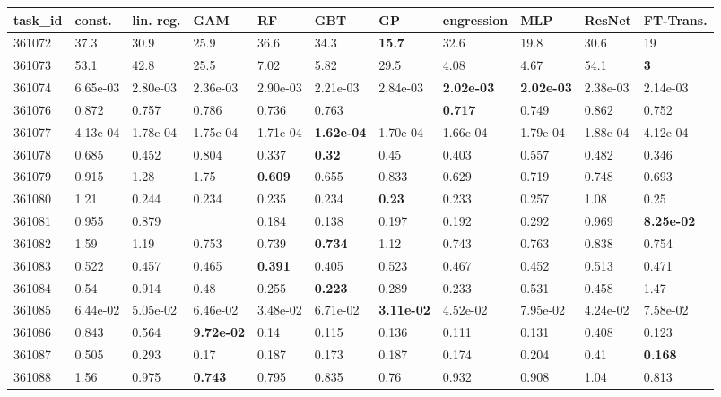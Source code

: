 \begin{table}[ht!]
\centering
\begingroup\footnotesize
\begin{tabular}{lllllllllll}
  \hline
\hline
task\_id & const. & lin. reg. & GAM & RF & GBT & GP & engression & MLP & ResNet & FT-Trans. \\ 
  \hline
361072 & 37.3 & 30.9 & 25.9 & 36.6 & 34.3 & \textbf{15.7} & 32.6 & 19.8 & 30.6 & 19 \\ 
  361073 & 53.1 & 42.8 & 25.5 & 7.02 & 5.82 & 29.5 & 4.08 & 4.67 & 54.1 & \textbf{3} \\ 
  361074 & 6.65e-03 & 2.80e-03 & 2.36e-03 & 2.90e-03 & 2.21e-03 & 2.84e-03 & \textbf{2.02e-03} & \textbf{2.02e-03} & 2.38e-03 & 2.14e-03 \\ 
  361076 & 0.872 & 0.757 & 0.786 & 0.736 & 0.763 &  & \textbf{0.717} & 0.749 & 0.862 & 0.752 \\ 
  361077 & 4.13e-04 & 1.78e-04 & 1.75e-04 & 1.71e-04 & \textbf{1.62e-04} & 1.70e-04 & 1.66e-04 & 1.79e-04 & 1.88e-04 & 4.12e-04 \\ 
  361078 & 0.685 & 0.452 & 0.804 & 0.337 & \textbf{0.32} & 0.45 & 0.403 & 0.557 & 0.482 & 0.346 \\ 
  361079 & 0.915 & 1.28 & 1.75 & \textbf{0.609} & 0.655 & 0.833 & 0.629 & 0.719 & 0.748 & 0.693 \\ 
  361080 & 1.21 & 0.244 & 0.234 & 0.235 & 0.234 & \textbf{0.23} & 0.233 & 0.257 & 1.08 & 0.25 \\ 
  361081 & 0.955 & 0.879 &  & 0.184 & 0.138 & 0.197 & 0.192 & 0.292 & 0.969 & \textbf{8.25e-02} \\ 
  361082 & 1.59 & 1.19 & 0.753 & 0.739 & \textbf{0.734} & 1.12 & 0.743 & 0.763 & 0.838 & 0.754 \\ 
  361083 & 0.522 & 0.457 & 0.465 & \textbf{0.391} & 0.405 & 0.523 & 0.467 & 0.452 & 0.513 & 0.471 \\ 
  361084 & 0.54 & 0.914 & 0.48 & 0.255 & \textbf{0.223} & 0.289 & 0.233 & 0.531 & 0.458 & 1.47 \\ 
  361085 & 6.44e-02 & 5.05e-02 & 6.46e-02 & 3.48e-02 & 6.71e-02 & \textbf{3.11e-02} & 4.52e-02 & 7.95e-02 & 4.24e-02 & 7.58e-02 \\ 
  361086 & 0.843 & 0.564 & \textbf{9.72e-02} & 0.14 & 0.115 & 0.136 & 0.111 & 0.131 & 0.408 & 0.123 \\ 
  361087 & 0.505 & 0.293 & 0.17 & 0.187 & 0.173 & 0.187 & 0.174 & 0.204 & 0.41 & \textbf{0.168} \\ 
  361088 & 1.56 & 0.975 & \textbf{0.743} & 0.795 & 0.835 & 0.76 & 0.932 & 0.908 & 1.04 & 0.813 \\ 

\end{tabular}
\end{table}
